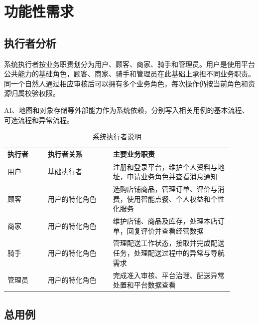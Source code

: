 \section{功能性需求}

\subsection{执行者分析}

系统执行者按业务职责划分为用户、顾客、商家、骑手和管理员。用户是使用平台公共能力的基础角色，顾客、商家、骑手和管理员在此基础上承担不同业务职责。同一个自然人通过相应审核后可以拥有多个业务角色，每次操作仍按当前角色和资源归属校验权限。

AI、地图和对象存储等外部能力作为系统依赖，分别写入相关用例的基本流程、可选流程和异常流程。

\begin{longtable}{|L{0.16\linewidth}|L{0.26\linewidth}|L{0.48\linewidth}|}
\caption{系统执行者说明}\label{tab:actors}\\ \hline
\textbf{执行者} & \textbf{执行者关系} & \textbf{主要业务职责} \\ \hline
用户 & 基础执行者 & 注册和登录平台，维护个人资料与地址，申请业务角色并查看消息通知 \\ \hline
顾客 & 用户的特化角色 & 选购店铺商品，管理订单、评价与消费，使用智能点餐、个人权益和个性化服务 \\ \hline
商家 & 用户的特化角色 & 维护店铺、商品及库存，处理本店订单，回复评价并查看经营数据 \\ \hline
骑手 & 用户的特化角色 & 管理配送工作状态，接取并完成配送任务，处理配送过程中的异常与导航需求 \\ \hline
管理员 & 用户的特化角色 & 完成准入审核、平台治理、配送异常处置和平台数据查看 \\ \hline
\end{longtable}

\subsection{总用例}

